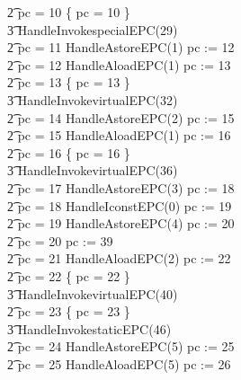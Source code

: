 \begin{figure}[p!]
\begin{minipage}{0.5\textwidth}
{\begin{circus}
    \t2 {} \circelse pc = 10 \circthen \{ pc = 10 \} \circseq \\
    \t3 HandleInvokespecialEPC(29) \\
    \t2 {} \circelse pc = 11 \circthen HandleAstoreEPC(1) \circseq pc := 12 \\
    \t2 {} \circelse pc = 12 \circthen HandleAloadEPC(1) \circseq pc := 13 \\
    \t2 {} \circelse pc = 13 \circthen \{ pc = 13 \} \circseq \\
    \t3 HandleInvokevirtualEPC(32) \\
    \t2 {} \circelse pc = 14 \circthen HandleAstoreEPC(2) \circseq pc := 15 \\
    \t2 {} \circelse pc = 15 \circthen HandleAloadEPC(1) \circseq pc := 16 \\
    \t2 {} \circelse pc = 16 \circthen \{ pc = 16 \} \circseq \\
    \t3 HandleInvokevirtualEPC(36) \\
    \t2 {} \circelse pc = 17 \circthen HandleAstoreEPC(3) \circseq pc := 18 \\
    \t2 {} \circelse pc = 18 \circthen HandleIconstEPC(0) \circseq pc := 19 \\
    \t2 {} \circelse pc = 19 \circthen HandleAstoreEPC(4) \circseq pc := 20 \\
    \t2 {} \circelse pc = 20 \circthen pc := 39 \\
    \t2 {} \circelse pc = 21 \circthen HandleAloadEPC(2) \circseq pc := 22 \\
    \t2 {} \circelse pc = 22 \circthen \{ pc = 22 \} \circseq \\
    \t3 HandleInvokevirtualEPC(40) \\
    \t2 {} \circelse pc = 23 \circthen \{ pc = 23 \} \circseq \\
    \t3 HandleInvokestaticEPC(46) \\
    \t2 {} \circelse pc = 24 \circthen HandleAstoreEPC(5) \circseq pc := 25 \\
    \t2 {} \circelse pc = 25 \circthen HandleAloadEPC(5) \circseq pc := 26 \\
  \end{circus}
  }
  \end{minipage}
  \begin{minipage}{0.5\textwidth}
\end{minipage}
\end{figure}

